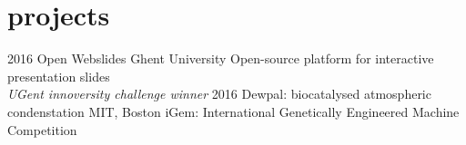 \documentclass[]{friggeri-cv}
\begin{document}
\vspace{0.5cm} \section{projects}
\begin{entrylist}
 \entry
 {2016}
 {Open Webslides}
 {Ghent University}
 {Open-source platform for interactive presentation slides \\ \emph{UGent innoversity challenge winner}}
 \entry
 {2016}
 {Dewpal: biocatalysed atmospheric condenstation}
 {MIT, Boston}
 {iGem: International Genetically Engineered Machine \\Competition}
\end{entrylist}
\end{document}
